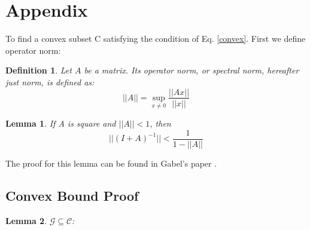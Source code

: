 \documentclass[11pt,twocolumn,varwidth=true,a4paper,fleqn]{article}
\newtheorem{lemma}{Lemma}
\newtheorem{definition}{Definition}
\begin{document}




\clearpage
\appendix
\section{Appendix} \label{AppendixA}
To find a convex subset C satisfying the condition of Eq. \ref{convex}. 
First we define operator norm:
\begin{definition}
Let $A$ be a matrix. Its operator norm, or
spectral norm, hereafter just norm, is defined as:
\begin{equation*}
||A|| = \sup_{x \neq 0}\frac{||Ax||}{||x||} 
\end{equation*}
\end{definition}

\begin{lemma} \label{lemma:newman}
If A is square and $||A|| < 1$, then
\begin{equation*}
||(I+A)^{-1}|| < \frac{1}{1-||A||}
\end{equation*}
\end{lemma}
The proof for this lemma can be found in Gabel's paper
\cite{gabel2015monitoring}.

\subsection{Convex Bound Proof}
\begin{lemma}
$\mathcal{G} \subseteq \mathcal{C}$:
\end{lemma}
\end{document}
